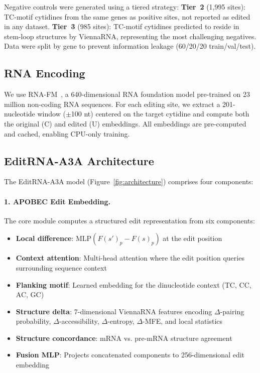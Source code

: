 \documentclass[11pt]{article}
\begin{document}
Negative controls were generated using a tiered strategy:
\textbf{Tier~2} (1,995 sites): TC-motif cytidines from the same genes as positive sites,
not reported as edited in any dataset.
\textbf{Tier~3} (985 sites): TC-motif cytidines predicted to reside in stem-loop
structures by ViennaRNA, representing the most challenging negatives.
Data were split by gene to prevent information leakage (60/20/20 train/val/test).

\subsection{RNA Encoding}

We use RNA-FM~\citep{chen2022rnafm}, a 640-dimensional RNA foundation model
pre-trained on 23 million non-coding RNA sequences. For each editing site,
we extract a 201-nucleotide window ($\pm$100 nt) centered on the target cytidine
and compute both the original (C) and edited (U) embeddings. All embeddings are
pre-computed and cached, enabling CPU-only training.

\subsection{EditRNA-A3A Architecture}

The EditRNA-A3A model (Figure~\ref{fig:architecture}) comprises four components:

\paragraph{1. APOBEC Edit Embedding.}
The core module computes a structured edit representation from six components:
\begin{itemize}
  \item \textbf{Local difference}: $\text{MLP}(F(s')_p - F(s)_p)$ at the edit position
  \item \textbf{Context attention}: Multi-head attention where the edit position
    queries surrounding sequence context
  \item \textbf{Flanking motif}: Learned embedding for the dinucleotide context
    (TC, CC, AC, GC)
  \item \textbf{Structure delta}: 7-dimensional ViennaRNA features encoding
    $\Delta$-pairing probability, $\Delta$-accessibility, $\Delta$-entropy,
    $\Delta$-MFE, and local statistics
  \item \textbf{Structure concordance}: mRNA vs. pre-mRNA structure agreement
  \item \textbf{Fusion MLP}: Projects concatenated components to 256-dimensional
    edit embedding
\end{itemize}
\end{document}
